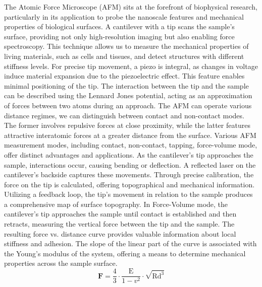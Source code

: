 \documentclass[a4paper,english,12pt,bibliography=totoc]{scrreprt}
\begin{document}
The Atomic Force Microscope (AFM) sits at the forefront of biophysical research, particularly in its application to probe the nanoscale features and mechanical properties of biological surfaces. A cantilever with a tip scans the sample's surface, providing not only high-resolution imaging but also enabling force spectroscopy. This technique allows us to measure the mechanical properties of living materials, such as cells and tissues, and detect structures with different stiffness levels.\newline
For precise tip movement, a piezo is integral, as changes in voltage induce material expansion due to the piezoelectric effect. This feature enables minimal positioning of the tip. The interaction between the tip and the sample can be described using the Lennard Jones potential, acting as an approximation of forces between two atoms during an approach.\newline
The AFM can operate various distance regimes, we can distinguish between contact and non-contact modes. The former involves repulsive forces at close proximity, while the latter features attractive interatomic forces at a greater distance from the surface. Various AFM measurement modes, including contact, non-contact, tapping, force-volume mode, offer distinct advantages and applications.\newline
As the cantilever's tip approaches the sample, interactions occur, causing bending or deflection. A reflected laser on the cantilever's backside captures these movements. Through precise calibration, the force on the tip is calculated, offering topographical and mechanical information. Utilizing a feedback loop, the tip's movement in relation to the sample produces a comprehensive map of surface topography.\newline
In Force-Volume mode, the cantilever's tip approaches the sample until contact is established and then retracts, measuring the vertical force between the tip and the sample. The resulting force vs. distance curve provides valuable information about local stiffness and adhesion. The slope of the linear part of the curve is associated with the Young’s modulus of the system, offering a means to determine mechanical properties across the sample surface.\newline
\[\textbf{F} = \frac{4}{3}\cdot \frac{\text{E}}{1-v^{2}}\cdot \sqrt{\text{Rd}^{3}}\]
\end{document}
